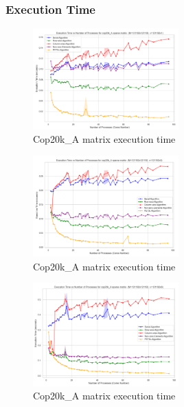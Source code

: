 \documentclass[12pt,oneside]{book} %
\begin{document}
\subsubsection{Execution Time}

\begin{figure}[H]
    \centering
    \includegraphics[width=0.5\textwidth]{../results/fat_vector_dim/cop20k_A_k1_execution_time.png}
    \caption{Cop20k\_A matrix execution time}\label{fig:cop20k-a-k1-execution-time}
\end{figure}

\begin{figure}[H]
    \centering
    \includegraphics[width=0.5\textwidth]{../results/fat_vector_dim/cop20k_A_k3_execution_time.png}
    \caption{Cop20k\_A matrix execution time}\label{fig:cop20k-a-k3-execution-time}
\end{figure}

\begin{figure}[H]
    \centering
    \includegraphics[width=0.5\textwidth]{../results/fat_vector_dim/cop20k_A_k6_execution_time.png}
    \caption{Cop20k\_A matrix execution time}\label{fig:cop20k-a-k6-execution-time-2}
\end{figure}
\end{document}
